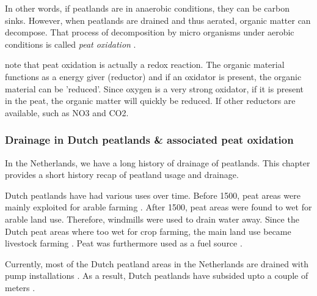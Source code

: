 \documentclass[12pt,a4paper,titlepage]{article}
\begin{document}
In other words, if peatlands are in anaerobic conditions, they can be carbon sinks. However, when peatlands are drained and thus aerated, organic matter can decompose. That process of decomposition by micro organisms under aerobic conditions is called \textit{peat oxidation} \citep{erkens2016double}.

\citet{smolders2013waterkwaliteit} note that peat oxidation is actually a redox reaction. The organic material functions as a energy giver (reductor) and if an oxidator is present, the organic material can be 'reduced'. Since oxygen is a very strong oxidator, if it is present in the peat, the organic matter will quickly be reduced. If other reductors are available, such as NO3 and CO2.

\subsubsection{Drainage in Dutch peatlands \& associated peat oxidation}

In the Netherlands, we have a long history of drainage of peatlands. This chapter provides a short history recap of peatland usage and drainage.


Dutch peatlands have had various uses over time. Before 1500, peat areas were mainly exploited for arable farming \citep{ettema2005boeren}. After 1500, peat areas were found to wet for arable land use. Therefore, windmills were used to drain water away. Since the Dutch peat areas where too wet for crop farming, the main land use became livestock farming \citep{brouns2016effects}. Peat was furthermore used as a fuel source \citep{van1996turfwinning}.


Currently, most of the Dutch peatland areas in the Netherlands are drained with pump installations \citep{brouns2016effects}. As a result, Dutch peatlands have subsided upto a couple of meters \citep{de2008vergeten}.
\end{document}
